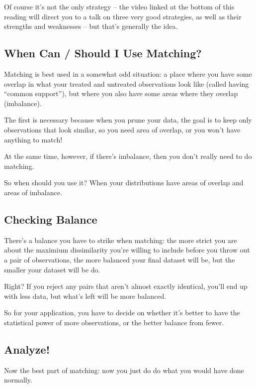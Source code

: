 \documentclass[letterpaper,10pt,english]{jupyterBook}
\begin{document}
\sphinxAtStartPar
Of course it’s not the only strategy – the video linked at the bottom of this reading will direct you to a talk on three very good strategies, as well as their strengths and weaknesses – but that’s generally the idea.


\subsection{When Can / Should I Use Matching?}
\label{\detokenize{35_causal/90_matching_how:when-can-should-i-use-matching}}
\sphinxAtStartPar
Matching is best used in a somewhat odd situation: a place where you have some overlap in what your treated and untreated observations look like (called having “common support”),  but where you also have some areas where they  overlap (imbalance).

\sphinxAtStartPar
The first is necessary because when you prune your data, the goal is to keep only observations that look similar, so you need  area of overlap, or you won’t have anything to match!

\sphinxAtStartPar
At the same time, however, if there’s  imbalance, then you don’t really need to do matching.

\sphinxAtStartPar
So when should you use it? When your distributions have  areas of overlap and areas of imbalance.


\subsection{Checking Balance}
\label{\detokenize{35_causal/90_matching_how:checking-balance}}
\sphinxAtStartPar
There’s a balance you have to strike when matching: the more strict you are about the maximium dissimilarity you’re willing to include before you throw out a pair of observations, the more balanced your final dataset will be, but the smaller your dataset will be do.

\sphinxAtStartPar
Right? If you reject any pairs that aren’t almost exactly identical, you’ll end up with less data, but what’s left will be more balanced.

\sphinxAtStartPar
So for your application, you have to decide on whether it’s better to have the statistical power of more observations, or the better balance from fewer.


\subsection{Analyze!}
\label{\detokenize{35_causal/90_matching_how:analyze}}
\sphinxAtStartPar
Now the best part of matching: now you just do do what you would have done normally.
\end{document}
